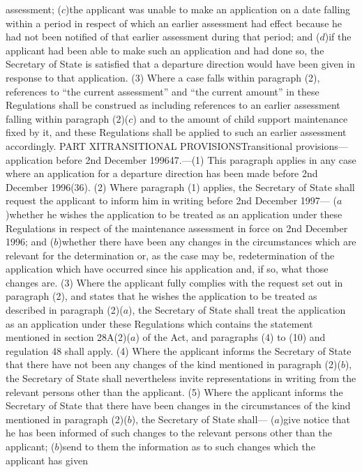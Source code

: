 \documentclass[a4paper]{article}
\begin{document}
assessment;
($c$)the applicant was unable to make an application on a date falling within a
period in respect of which an earlier assessment had effect because he had not
been notified of that earlier assessment during that period; and
($d$)if the applicant had been able to make such an application and had done so,
the Secretary of State is satisfied that a departure direction would have been
given in response to that application.
(3) Where a case falls within paragraph (2), references to “the current
assessment” and “the current amount” in these Regulations shall be construed as
including references to an earlier assessment falling within paragraph (2)($c$)
and to the amount of child support maintenance fixed by it, and these
Regulations shall be applied to such an earlier assessment accordingly.
PART XITRANSITIONAL PROVISIONSTransitional provisions—application before 2nd
December 199647.—(1) This paragraph applies in any case where an application for
a departure direction has been made before 2nd December 1996(36).
(2) Where paragraph (1) applies, the Secretary of State shall request the
applicant to inform him in writing before 2nd December 1997—
($a$)whether he wishes the application to be treated as an application under these
Regulations in respect of the maintenance assessment in force on 2nd December
1996; and
($b$)whether there have been any changes in the circumstances which are relevant
for the determination or, as the case may be, redetermination of the application
which have occurred since his application and, if so, what those changes are.
(3) Where the applicant fully complies with the request set out in paragraph
(2), and states that he wishes the application to be treated as described in
paragraph (2)($a$), the Secretary of State shall treat the application as an
application under these Regulations which contains the statement mentioned in
section 28A(2)($a$) of the Act, and paragraphs (4) to (10) and regulation 48 shall
apply.
(4) Where the applicant informs the Secretary of State that there have not been
any changes of the kind mentioned in paragraph (2)($b$), the Secretary of State
shall nevertheless invite representations in writing from the relevant persons
other than the applicant.
(5) Where the applicant informs the Secretary of State that there have been
changes in the circumstances of the kind mentioned in paragraph (2)($b$), the
Secretary of State shall—
($a$)give notice that he has been informed of such changes to the relevant persons
other than the applicant;
($b$)send to them the information as to such changes which the applicant has given
\end{document}
